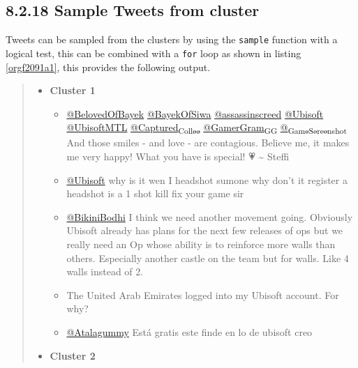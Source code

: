 \documentclass[11pt]{article}
\begin{document}
\subsection{8.2.18 Sample Tweets from cluster}
\label{sec:orgb169a5a}
Tweets can be sampled from the clusters by using the \texttt{sample} function with a logical test, this can be combined with a \texttt{for} loop as shown in listing \ref{orgf2091a1}, this provides the following output.


\begin{quote}
\begin{itemize}
\item \textbf{Cluster 1}
\begin{itemize}
\item \href{https://twitter.com/search?q=\%40BelovedOfBayek\&src=typed\_query}{@BelovedOfBayek}
 \href{https://twitter.com/search?q=\%40BayekOfSiwa\&src=typed\_query}{@BayekOfSiwa} \href{https://twitter.com/search?q=\%40assassinscreed\&src=typed\_query}{@assassinscreed} \href{https://twitter.com/search?q=\%40Ubisoft\&src=typed\_query}{@Ubisoft} \href{https://twitter.com/search?q=\%40UbisoftMTL\&src=typed\_query}{@UbisoftMTL}
\href{https://twitter.com/search?q=\%40Captured\_Collec\&src=typed\_query}{@Captured\textsubscript{Collec}} \href{https://twitter.com/search?q=\%40GamerGram\_GG\&src=typed\_query}{@GamerGram\textsubscript{GG}} \href{https://twitter.com/search?q=\%40\_GameScreenshot\&src=typed\_query}{@\textsubscript{GameScreenshot}} And those smiles - and
love - are contagious. Believe me, it makes me very happy! What you have is
special! 💗 \textasciitilde{} Steffi
\item \href{https://twitter.com/search?q=\%40Ubisoft}{@Ubisoft} why is it wen I headshot sumone why don’t it register a headshot
is a 1 shot kill fix your game sir
\item \href{https://twitter.com/search?q=\%40BikiniBodhi}{@BikiniBodhi} I think we need another movement going. Obviously Ubisoft
already has plans for the next few releases of ops but we really need an Op
whose ability is to reinforce more walls than others. Especially another
castle on the team but for walls. Like 4 walls instead of 2.
\item The United Arab Emirates logged into my Ubisoft account. For why?
\item \href{https://twitter.com/search?q=\%40Atalagummy}{@Atalagummy} Está gratis este finde en lo de ubisoft creo
\end{itemize}
\item \textbf{Cluster 2}

\end{itemize}
\end{quote}
\end{document}
